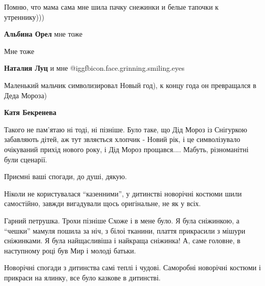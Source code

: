  
 
 
 
 
\zzSecCmt

\begin{itemize} %
Помню, что мама сама мне шила пачку снежинки и белые тапочки к утреннику)))

\textbf{Альбина Орел} мне тоже

Мне тоже

\textbf{Наталия Луц} и мне @igg{fbicon.face.grinning.smiling.eyes} 

Маленький мальчик символизировал Новый год), к концу года он превращался в Деда Мороза)

\begin{itemize} %
\textbf{Катя Бекренева} 

Такого не пам'ятаю ні тоді, ні пізніше. Було таке, що Дід Мороз із Снігуркою
забавляють дітей, аж тут звляється хлопчик - Новий рік, і це символізувало
очікуваний прихід нового року, і Дід Мороз прощався.... Мабуть, різноманітні
були сценарії.

\end{itemize} %

Приємні ваші спогади, до душі, дякую.

Ніколи не користувалася \enquote{казенними}, у дитинстві новорічні костюми шили
самостійно, завжди вигадували щось оригінальне, не як у всіх.



Гарний петрушка. Трохи пізніше Схоже і в мене було. Я була сніжинкою, а
\enquote{чешки} мамуля пошила за ніч, з білоі тканини, плаття прикрасили з мішури
сніжинками. Я була найщасливіша і найкраща сніжинка! А, саме головне, в наступному
році був Мир і молоді батьки.


Новорічні спогади з дитинства самі теплі і чудові. Саморобні новорічні костюми і
прикраси на ялинку, все було казкове в дитинстві.



\end{itemize}
